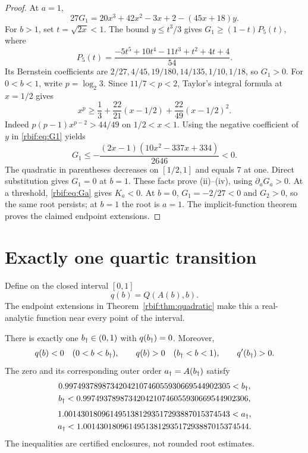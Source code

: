 \begin{proof}
At $a=1$,
\begin{equation}
 27G_1=20x^3+42x^2-3x+2-(45x+18)y.
 \label{rbif:eq:G1}
\end{equation}
For $b>1$, set $t=\sqrt{2x}<1$. The bound $y\le t^3/3$ gives
$G_1\ge(1-t)P_5(t)$, where
\[
 P_5(t)=\frac{-5t^5+10t^4-11t^3+t^2+4t+4}{54}.
\]
Its Bernstein coefficients are
$2/27,4/45,19/180,14/135,1/10,1/18$, so $G_1>0$.
For $0<b<1$, write $p=\log_2 3$. Since $11/7<p<2$, Taylor's
integral formula at $x=1/2$ gives
\[
 x^p\ge\frac13+\frac{22}{21}(x-1/2)+\frac{22}{49}(x-1/2)^2.
\]
Indeed $p(p-1)x^{p-2}>44/49$ on $1/2<x<1$.
Using the negative coefficient of $y$ in \eqref{rbif:eq:G1} yields
\[
 G_1\le-\frac{(2x-1)(10x^2-337x+334)}{2646}<0.
\]
The quadratic in parentheses decreases on $[1/2,1]$ and equals $7$ at
one. Direct substitution gives $G_1=0$ at $b=1$.
These facts prove (ii)--(iv), using $\partial_aG_a>0$.
At a threshold, \eqref{rbif:eq:Ga} gives $K_a<0$.
At $b=0$, $G_1=-2/27<0$ and $G_2>0$, so the same root persists;
at $b=1$ the root is $a=1$. The implicit-function theorem proves the
claimed endpoint extensions.
\end{proof}

\section{Exactly one quartic transition}
\label{rbif:sec:quartic}
Define on the closed interval $[0,1]$
\begin{equation}
 q(b)=Q(A(b),b).
 \label{rbif:eq:qdef}
\end{equation}
The endpoint extensions in Theorem~\ref{rbif:thm:quadratic} make this a
real-analytic function near every point of the interval.

\begin{theorem}
\label{rbif:thm:quartic}
There is exactly one $b_\dagger\in(0,1)$ with $q(b_\dagger)=0$.
Moreover,
\begin{equation}
 q(b)<0\quad(0<b<b_\dagger),\qquad
 q(b)>0\quad(b_\dagger<b<1),\qquad q'(b_\dagger)>0.
 \label{rbif:eq:qsigns}
\end{equation}
The zero and its corresponding outer order $a_\dagger=A(b_\dagger)$ satisfy
\begin{equation}
 \begin{gathered}
 0.9974937898734204210746055930669544902305<b_\dagger,\\
 b_\dagger<0.9974937898734204210746055930669544902306,
 \end{gathered}\label{rbif:eq:bbox}
\end{equation}
\begin{equation}
 \begin{gathered}
 1.0014301809614951381293517293887015374543<a_\dagger,\\
 a_\dagger<1.0014301809614951381293517293887015374544.
 \end{gathered}\label{rbif:eq:abox}
\end{equation}
The inequalities are certified enclosures, not rounded root estimates.
\end{theorem}

